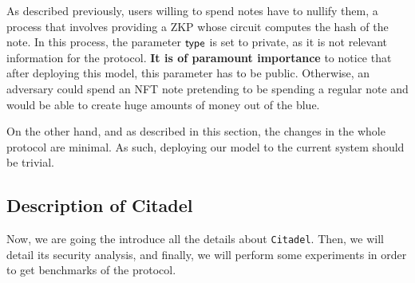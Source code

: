 As described previously, users willing to spend notes have to nullify them, a process that involves providing a ZKP whose circuit computes the hash of the note. In this process, the parameter $\mathsf{type}$ is set to private, as it is not relevant information for the protocol. \textbf{It is of paramount importance} to notice that after deploying this model, this parameter has to be public. Otherwise, an adversary could spend an NFT note pretending to be spending a regular note and would be able to create huge amounts of money out of the blue.

On the other hand, and as described in this section, the changes in the whole protocol are minimal. As such, deploying our model to the current system should be trivial.





\subsection{Description of Citadel}
\label{sec:citadel}

Now, we are going the introduce all the details about \verb!Citadel!. Then, we will detail its security analysis, and finally, we will perform some experiments in order to get benchmarks of the protocol.


